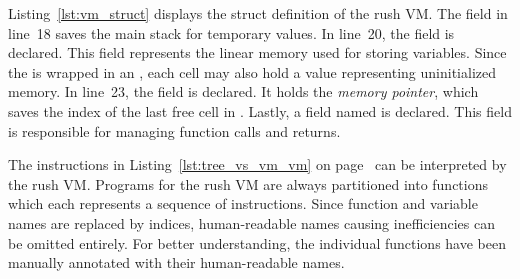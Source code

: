 
Listing~\ref{lst:vm_struct} displays the struct definition of the rush VM\@.
The  field in line~18 saves the main stack for temporary values.
In line~20, the  field is declared.
This field represents the linear memory used for storing variables.
Since the  is wrapped in an , each cell may also hold a  value representing uninitialized memory.
In line~23, the  field is declared.
It holds the \emph{memory pointer}, which saves the index of the last free cell in .
Lastly, a field named  is declared.
This field is responsible for managing function calls and returns.

The instructions in Listing~\ref{lst:tree_vs_vm_vm} on page~\pageref{lst:tree_vs_vm_vm} can be interpreted by the rush VM\@.
Programs for the rush VM are always partitioned into functions which each represents a sequence of instructions.
Since function and variable names are replaced by indices, human-readable names causing inefficiencies can be omitted entirely.
For better understanding, the individual functions have been manually annotated with their human-readable names.

